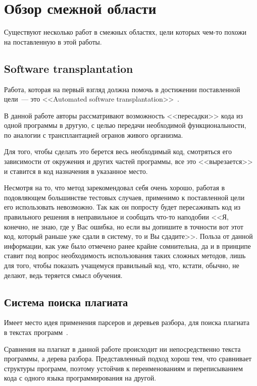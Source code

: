 \section{Обзор смежной области}
Существуют несколько работ в смежных областях, цели которых чем-то похожи на поставленную в этой работы.

\subsection{Software transplantation}
Работа, которая на первый взгляд должна помочь в достижении поставленной цели~--- 
это <<Automated software transplantation>>~\cite{software-transplantation}.

В данной работе авторы рассматривают возможность <<пересадки>> кода из одной программы в другую, с целью передачи 
необходимой функциональности, по аналогии с трансплантацией огранов живого организма.

Для того, чтобы сделать это берется весь необходимый код, смотряться его зависимости от окружения и других частей программы, 
все это <<вырезается>> и ставится в код назначения в указанное место.

Несмотря на то, что метод зарекомендовал себя очень хорошо, работая в подовляющем большинстве тестовых случаев, применимо к поставленной
цели его использовать невозможно. Так как он попросту будет пересаживать код из правильного решения в неправильное и сообщать
что-то наподобии <<Я, конечно, не знаю, где у Вас ошибка, но если вы допишите в точности вот этот код, 
который раньше уже сдали в систему, то и Вы сдадите>>. Польза от данной информации, как уже было отмечено ранее крайне сомнительна,
да и в принципе ставит под вопрос необходимость использования таких сложных методов, лишь для того, чтобы показать учащемуся
правильный код, что, кстати, обычно, не делают, ведь теряется смысл обучения.

\subsection{Система поиска плагиата}
Имеет место идея применения парсеров и деревьев разбора, для поиска плагиата в текстах программ~\cite{anti-plagiat}.

Сравнения на плагиат в данной работе происходит ни непосредственно текста программы, а дерева разбора. Представленный
подход хорош тем, что сравнивает структуры программ, поэтому устойчив к переименованиям и переписыванием кода
с одного языка программирования на другой.

